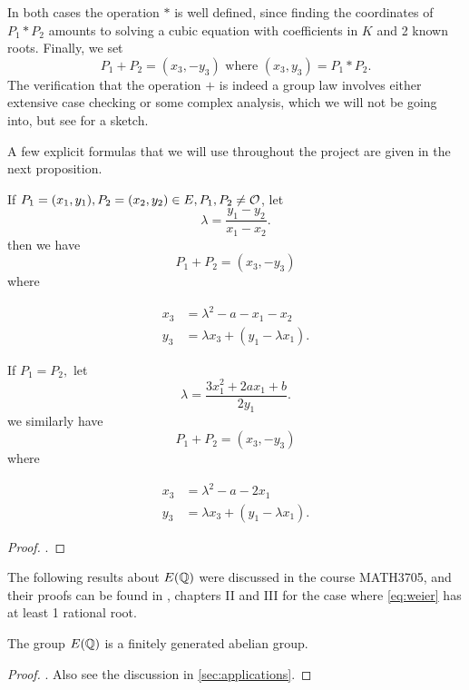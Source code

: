 \documentclass[12pt, a4paper]{report}
\begin{document}
In both cases the operation $*$ is well defined,
since finding the coordinates of $P_1 * P_2$ amounts to solving
a cubic equation with coefficients in $K$ and 2 known roots.
Finally, we set
\[P_1 + P_2 = (x_3, -y_3) \text{ where } (x_3,y_3) = P_1 * P_2.\]
The verification that the operation $+$ is indeed a group law involves either
extensive case checking or
some complex analysis, which we will not be going into, but see
\cite[129-137]{Granville} for a sketch.

A few explicit formulas that we will use throughout the project
are given in the next proposition. 

\begin{prop}
  If $P_1 = (x_1,y_1), P_2 = (x_2,y_2) \in E, P_1, P_2 \neq {\mathcal O}$, let
  $$\lambda = \frac{y_1-y_2}{x_1-x_2}.$$
  then we have
  \[P_1 + P_2 = (x_3,-y_3)\]
  where

  \begin{equation} \label{eq:adddiff}
    \begin{split}
      x_3 &= \lambda^2 - a - x_1 - x_2 \\
      y_3 &= \lambda x_3 + (y_1 - \lambda x_1).
    \end{split}
  \end{equation}

  If $P_1 = P_2,$ let
  \[\lambda = \frac{3x_1^2 + 2ax_1 + b}{2y_1}.\]
  we similarly have
  \[P_1 + P_2 = (x_3,-y_3)\]
  where
  
  \begin{equation} \label {eq:addsim}
    \begin{split}
      x_3 &= \lambda^2 - a - 2x_1 \\
      y_3 &= \lambda x_3 + (y_1 - \lambda x_1).
    \end{split}
  \end{equation}
\end{prop}
\begin{proof}
  \cite[See][Chapter 1.7, page 34]{modular}.
\end{proof}

The following results about $E({\mathbb Q})$ were discussed in the course MATH3705,
and their proofs can be found in \cite{rational}, chapters II and III for the
case where \autoref{eq:weier} has at least 1 rational root.

\begin{thm}
  The group $E({\mathbb Q})$ is a finitely generated abelian group.
\end{thm}  
\begin{proof}
  \cite[See][Chapter III, pages 63-88]{rational}. Also see the discussion in
  \autoref{sec:applications}.
\end{proof}
\end{document}
